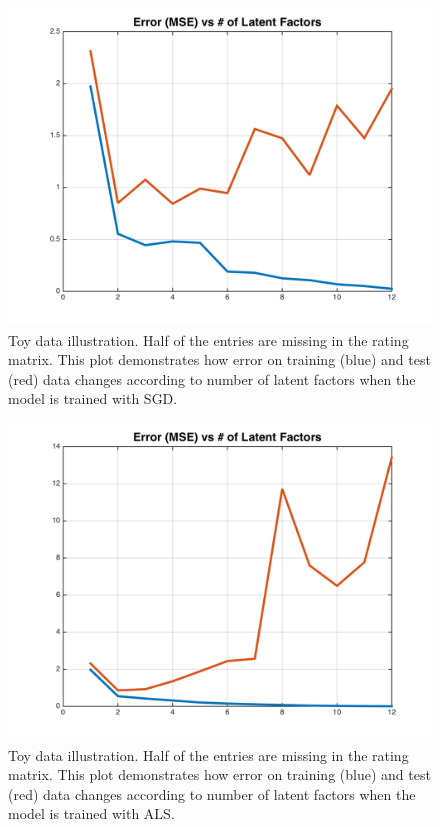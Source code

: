 \documentclass[11pt]{article}
\begin{document}
	
	
	
	
	\begin{figure}[H]
		\centering		
		\includegraphics[width=\wi]{buff4/l_sgd_toy}
		\caption{Toy data illustration. Half of the entries are missing in the rating matrix. This plot demonstrates how error on training (blue) and test (red) data changes according to number of latent factors when the model is trained with SGD. }
		\label{5}		
	\end{figure}
	\clearpage
	
	\begin{figure}[H]
		\centering		
		\includegraphics[width=\wi]{buff4/l_als_toy}
		\caption{Toy data illustration. Half of the entries are missing in the rating matrix. This plot demonstrates how error on training (blue) and test (red) data changes according to number of latent factors when the model is trained with ALS. }
		\label{5}		
	\end{figure}
\end{document}
